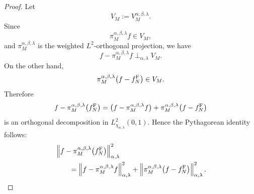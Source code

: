 \documentclass[UTF8]{ctexart}
\begin{document}
\begin{proof}
Let
\[
    V_M
    :=
    V_M^{\alpha,\beta,\lambda}.
\]
Since
\[
    \pi_M^{\alpha,\beta,\lambda}f\in V_M,
\]
and $\pi_M^{\alpha,\beta,\lambda}$ is the weighted $L^2$-orthogonal projection,
we have
\[
    f-\pi_M^{\alpha,\beta,\lambda}f
    \perp_{\alpha,\lambda}
    V_M.
\]
On the other hand,
\[
    \pi_M^{\alpha,\beta,\lambda}
    \bigl(f-f_N^{\rm F}\bigr)
    \in V_M.
\]
Therefore
\[
    f-\pi_M^{\alpha,\beta,\lambda}
    \bigl(f_N^{\rm F}\bigr)
    =
    \bigl(f-\pi_M^{\alpha,\beta,\lambda}f\bigr)
    +
    \pi_M^{\alpha,\beta,\lambda}
    \bigl(f-f_N^{\rm F}\bigr)
\]
is an orthogonal decomposition in $L^2_{\chi_{\alpha,\lambda}}(0,1)$.
Hence the Pythagorean identity follows:
\[
\begin{aligned}
    &
    \left\|
    f-\pi_M^{\alpha,\beta,\lambda}
    \bigl(f_N^{\rm F}\bigr)
    \right\|_{\alpha,\lambda}^2
    \\
    &\qquad
    =
    \left\|
    f-\pi_M^{\alpha,\beta,\lambda}f
    \right\|_{\alpha,\lambda}^2
    +
    \left\|
    \pi_M^{\alpha,\beta,\lambda}
    \bigl(f-f_N^{\rm F}\bigr)
    \right\|_{\alpha,\lambda}^2 .
\end{aligned}
\]


\end{proof}
\end{document}
